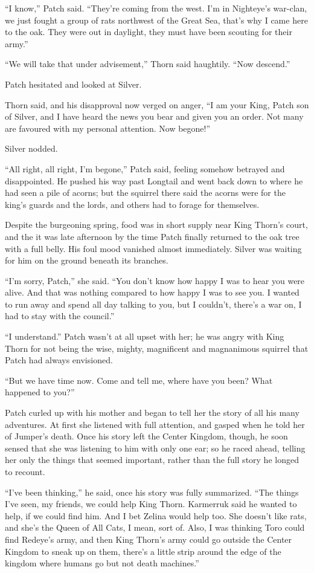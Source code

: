 \documentclass[ebook,oneside,openany,17pt]{memoir}
\newenvironment{tolerant}[1]{%
  \par\tolerance=#1\relax
}{%
  \par
}
\begin{document}
“I know,” Patch said. “They’re coming from the west. I’m in Nighteye’s
war-clan, we just fought a group of rats northwest of the Great Sea,
that’s why I came here to the oak. They were out in daylight, they
must have been scouting for their army.”

“We will take that under advisement,” Thorn said haughtily. “Now
descend.”

Patch hesitated and looked at Silver.

Thorn said, and his disapproval now verged on anger, “I am your King,
Patch son of Silver, and I have heard the news you bear and given you
an order. Not many are favoured with my personal attention. Now
begone!”

Silver nodded.

“All right, all right, I’m begone,” Patch said, feeling somehow
betrayed and disappointed. He pushed his way past Longtail and went
back down to where he had seen a pile of acorns; but the squirrel
there said the acorns were for the king’s guards and the lords, and
others had to forage for themselves.

Despite the burgeoning spring, food was in short supply near King
Thorn’s court, and the it was late afternoon by the time Patch finally
returned to the oak tree with a full belly. His foul mood vanished
almost immediately. Silver was waiting for him on the ground beneath
its branches.

“I’m sorry, Patch,” she said. “You don’t know how happy I was to hear
you were alive. And that was nothing compared to how happy I was to
see you. I wanted to run away and spend all day talking to you, but I
couldn’t, there’s a war on, I had to stay with the council.”

“I understand.” Patch wasn’t at all upset with her; he was angry with
King Thorn for not being the wise, mighty, magnificent and magnanimous
squirrel that Patch had always envisioned.

“But we have time now. Come and tell me, where have you been? What
happened to you?”

Patch curled up with his mother and began to tell her the story of all
his many adventures. At first she listened with full attention, and
gasped when he told her of Jumper’s death. Once his story left the
Center Kingdom, though, he soon sensed that she was listening to him
with only one ear; so he raced ahead, telling her only the things that
seemed important, rather than the full story he longed to recount.

\begin{tolerant}{500}
“I’ve been thinking,” he said, once his story was fully
summarized. “The things I’ve seen, my friends, we could help King
Thorn. Karmerruk said he wanted to help, if we could find him. And I
bet Zelina would help too. She doesn’t like rats, and she’s the Queen
of All Cats, I mean, sort of. Also, I was thinking Toro could find
Redeye’s army, and then King Thorn’s army could go outside the Center
Kingdom to sneak up on them, there’s a little strip around the edge of
the kingdom where humans go but not death machines.”
\end{tolerant}
\end{document}
